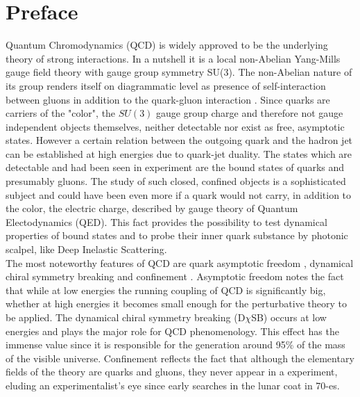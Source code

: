 \chapter*{Preface}
\label{chap:Intro}

Quantum Chromodynamics (QCD) is widely approved to be the underlying theory of strong interactions. In a nutshell it is a local non-Abelian Yang-Mills gauge field theory with gauge group symmetry SU(3). The non-Abelian nature of its group renders itself on diagrammatic level as presence of self-interaction between gluons in addition to the quark-gluon interaction \cite{Fritzsch1973365}. Since quarks are carriers of the "color", the $SU(3)$ gauge group charge and therefore not gauge independent objects themselves, neither detectable nor exist as free, asymptotic states. However a certain relation between the outgoing quark and the hadron jet can be established at high energies due to quark-jet duality. The states which are detectable and had been seen in experiment are the bound states of quarks and presumably gluons. The study of such closed, confined objects is a sophisticated subject and could have been even more if a quark would not carry, in addition to the color, the electric charge, described by gauge theory of Quantum Electodynamics (QED). This fact provides the possibility to test dynamical properties of bound states and to probe their inner quark substance by photonic scalpel, like Deep Inelastic Scattering. \\ 

The most noteworthy features of QCD are quark asymptotic freedom \cite{PhysRevLett.30.1343, Gross:1973ju}, dynamical chiral symmetry breaking \cite{PhysRev.122.345} and confinement \cite{Greensite201101}. Asymptotic freedom notes the fact that while at low energies the running coupling of QCD is significantly big, whether at high energies it becomes small enough for the perturbative theory to be applied. The dynamical chiral symmetry breaking (D$\chi$SB) occurs at low energies and plays the major role for QCD phenomenology. This effect has the immense value since it is responsible for the generation around 95\% of the mass of the visible universe. Confinement reflects the fact that although the elementary fields of the theory are quarks and gluons, they never appear in a experiment, eluding an experimentalist's eye since early searches in the lunar coat in 70-es. \\


